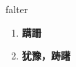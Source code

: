 
\begin{frame}
{\huge falter}
\begin{center}
\begin{enumerate}\Large
  \item \textbf{蹒跚}
  \item \textbf{犹豫，踌躇}
\end{enumerate}
\end{center}
\end{frame}

